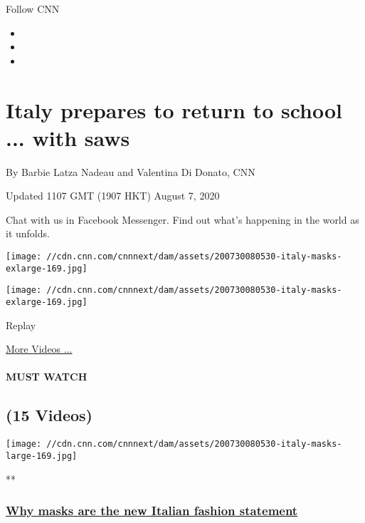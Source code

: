 Follow CNN

\begin{itemize}
\item
\item
\item
\end{itemize}

\hypertarget{italy-prepares-to-return-to-school--with-saws}{%
\section{Italy prepares to return to school ... with
saws}\label{italy-prepares-to-return-to-school--with-saws}}

By Barbie Latza Nadeau and Valentina Di Donato, CNN

Updated 1107 GMT (1907 HKT) August 7, 2020

Chat with us in Facebook Messenger. Find out what's happening in the
world as it unfolds.

\texttt{[image: //cdn.cnn.com/cnnnext/dam/assets/200730080530-italy-masks-exlarge-169.jpg]}

\texttt{[image: //cdn.cnn.com/cnnnext/dam/assets/200730080530-italy-masks-exlarge-169.jpg]}\href{javascript:void(0);}{}

Replay

\href{/videos}{More Videos ...}

\hypertarget{must-watch}{%
\paragraph{MUST WATCH}\label{must-watch}}

\hypertarget{15-videos}{%
\subsection{(15 Videos)}\label{15-videos}}

\href{/videos/world/2020/07/30/italy-mask-wearing-pandemic-nadeau-pkg-vpx.cnn/video/playlists/coronavirus-intl/}{}

\texttt{[image: //cdn.cnn.com/cnnnext/dam/assets/200730080530-italy-masks-large-169.jpg]}

**

\hypertarget{why-masks-are-the-new-italian-fashion-statement}{%
\subsubsection{\texorpdfstring{\href{/videos/world/2020/07/30/italy-mask-wearing-pandemic-nadeau-pkg-vpx.cnn/video/playlists/coronavirus-intl/}{Why
masks are the new Italian fashion
statement}}{Why masks are the new Italian fashion statement}}\label{why-masks-are-the-new-italian-fashion-statement}}

